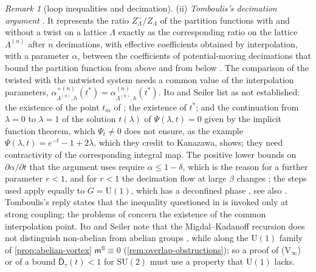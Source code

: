 \documentclass[11pt,a4paper]{amsart}
\theoremstyle{definition}
\theoremstyle{remark}
\newtheorem{remark}[theorem]{Remark}
\numberwithin{equation}{section}
\newcommand{\SU}{\mathrm{SU}}              %
\newcommand{\U}{\mathrm{U}}                %
\begin{document}
\begin{remark}[loop inequalities and decimation]
(ii) \emph{Tomboulis's decimation argument} \cite{tomboulis2007}. It represents the ratio $Z^-_\Lambda/Z_\Lambda$ of the partition functions with and without a twist on a lattice $\Lambda$ exactly as the corresponding ratio on the lattice $\Lambda^{(n)}$ after $n$ decimations, with effective coefficients obtained by interpolation, with a parameter $\alpha$, between the coefficients of potential-moving decimations that bound the partition function from above and from below \cite[eqs.~(5.17), (5.23)]{tomboulis2007}. The comparison of the twisted with the untwisted system needs a common value of the interpolation parameters, $\alpha^{+(n)}_{\Lambda^{(n)},h}(t^*)=\alpha^{(n)}_{\Lambda^{(n)},h}(t^*)$. Ito and Seiler \cite[Section~3.2]{itoseiler2008} list as not established: the existence of the point $t_m$ of \cite[eq.~(5.9)]{tomboulis2007}; the existence of $t^*$; and the continuation from $\lambda=0$ to $\lambda=1$ of the solution $t(\lambda)$ of $\Psi(\lambda,t)=0$ given by the implicit function theorem, which $\Psi_t\ne0$ does not ensure, as the example $\Psi(\lambda,t)=e^{-t}-1+2\lambda$, which they credit to Kanazawa, shows; they need contractivity of the corresponding integral map. The positive lower bounds on $\partial\alpha/\partial t$ that the argument uses require $\alpha\le1-\delta$, which is the reason for a further parameter $r<1$, and for $r<1$ the decimation flow at large $\beta$ changes \cite[Sections~3.1, 3.3]{itoseiler2008}; the steps used apply equally to $G=\U(1)$, which has a deconfined phase \cite[Sections~3.2, 4]{itoseiler2008}, see also \cite{itoseiler2007}. Tomboulis's reply \cite{tomboulis2007reply} states that the inequality \cite[eq.~(5.15)]{tomboulis2007} questioned in \cite{itoseiler2007} is invoked only at strong coupling; the problems of \cite{itoseiler2008} concern the existence of the common interpolation point. Ito and Seiler note that the Migdal--Kadanoff recursion does not distinguish non-abelian from abelian groups \cite[Section~4]{itoseiler2008}, while along the $\U(1)$ family of \cref{prop:abelian-vortex} $\mathsf m^{\mathrm{fl}}\equiv0$ (\cref{rem:overlap-obstructions}); so a proof of \textup{(V$_\infty$)} or of a bound $\bar{\mathsf D}_\tau(t)<1$ for $\SU(2)$ must use a property that $\U(1)$ lacks.


\end{remark}
\end{document}
